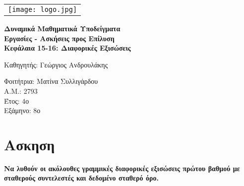 \documentclass[a4paper,12pt]{article}
\begin{document}
\thispagestyle{empty}


\begin{center}
\begin{tabular}{@{}c@{}}
\texttt{[image: logo.jpg]}
\end{tabular}
\end{center}

\vspace{5\baselineskip}

\begin{center}
{\LARGE\textbf{Δυναμικά Μαθηματικά Υποδείγματα}}\\[5\baselineskip]



{\large\textbf{ Εργασίες - Ασκήσεις προς Επίλυση \\[5pt]Κεφάλαια 15-16: Διαφορικές Εξισώσεις}}
\end{center}

\vspace{15\baselineskip}

\begin{center}
Καθηγητής: Γεώργιος Ανδρουλάκης




\vspace{\baselineskip}
\noindent

Φοιτήτρια: Ματίνα Συλλιγάρδου\\
Α.Μ.: 2793\\
Έτος: $4$ο\\
Εξάμηνο: $8$ο
\end{center}



\vfill





\section{Ασκηση}

{\bfseries Να λυθούν οι ακόλουθες γραμμικές διαφορικές εξισώσεις πρώτου βαθμού με σταθερούς συντελεστές και δεδομένο σταθερό όρο.}

\vspace{2\baselineskip}
\end{document}
